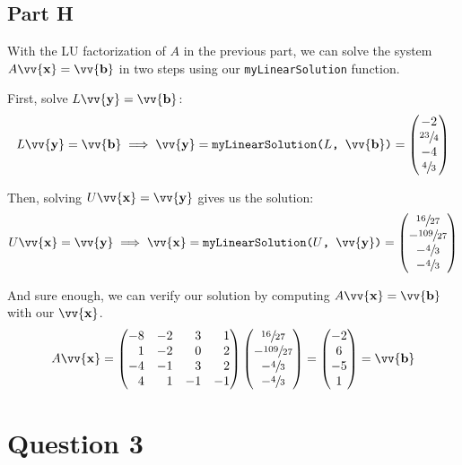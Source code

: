 \documentclass[12pt]{article}
\newcommand{\vect}[1]{\vv{\mathbf{#1}}}
\newcommand{\code}[1]{\texttt{#1}}
\begin{document}
\subsection*{Part H}

With the LU factorization of $A$ in the previous part, we can solve the system $A\vect{x}=\vect{b}$ in two steps using our \code{myLinearSolution} function.

First, solve $L\vect{y}=\vect{b}$:
$$
L\vect{y}=\vect{b} \implies \vect{y} = \code{myLinearSolution($L$, $\vect{b}$)} = \begin{pmatrix*}
    -2 \\ \sfrac{23}{4} \\ -4 \\ \sfrac{4}{3}
\end{pmatrix*}
$$

Then, solving $U\vect{x}=\vect{y}$ gives us the solution:
$$
U\vect{x}=\vect{y} \implies \vect{x} = \code{myLinearSolution($U$, $\vect{y}$)} = \begin{pmatrix*}
    \sfrac{16}{27} \\ -\sfrac{109}{27} \\ -\sfrac{4}{3} \\ -\sfrac{4}{3}
\end{pmatrix*}
$$

And sure enough, we can verify our solution by computing $A\vect{x}=\vect{b}$ with our $\vect{x}$.
$$
A\vect{x}=\begin{pmatrix*}[r]
    -8 & -2 & 3 & 1 \\
    1 & -2 &  0  & 2 \\
    -4 & -1 & 3 & 2 \\
    4 & 1 & -1 & -1
\end{pmatrix*}
\begin{pmatrix*}
    \sfrac{16}{27} \\ -\sfrac{109}{27} \\ -\sfrac{4}{3} \\ -\sfrac{4}{3}
\end{pmatrix*}
= \begin{pmatrix*}
    -2 \\ 6 \\ -5 \\ 1
\end{pmatrix*}
= \vect{b}
$$

\section*{Question 3}
\end{document}
